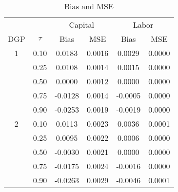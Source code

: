 \begin{table}[ht]
\centering
\caption{Bias and MSE} 
\begin{tabular}{cccccc}
  \hline\hline & & \multicolumn{2}{c}{Capital} & \multicolumn{2}{c}{Labor} \\ \cmidrule(lr){3-4} \cmidrule(lr){5-6}DGP & $\tau$ & Bias & MSE & Bias & MSE \\ 
  \hline
1 & 0.10 & 0.0183 & 0.0016 & 0.0029 & 0.0000 \\ 
   & 0.25 & 0.0108 & 0.0014 & 0.0015 & 0.0000 \\ 
   & 0.50 & 0.0000 & 0.0012 & 0.0000 & 0.0000 \\ 
   & 0.75 & -0.0128 & 0.0014 & -0.0005 & 0.0000 \\ 
   & 0.90 & -0.0253 & 0.0019 & -0.0019 & 0.0000 \\ 
  2 & 0.10 & 0.0113 & 0.0023 & 0.0036 & 0.0001 \\ 
   & 0.25 & 0.0095 & 0.0022 & 0.0006 & 0.0000 \\ 
   & 0.50 & -0.0030 & 0.0021 & 0.0000 & 0.0000 \\ 
   & 0.75 & -0.0175 & 0.0024 & -0.0016 & 0.0000 \\ 
   & 0.90 & -0.0263 & 0.0029 & -0.0046 & 0.0001 \\ 
   \hline
\end{tabular}
\end{table}
